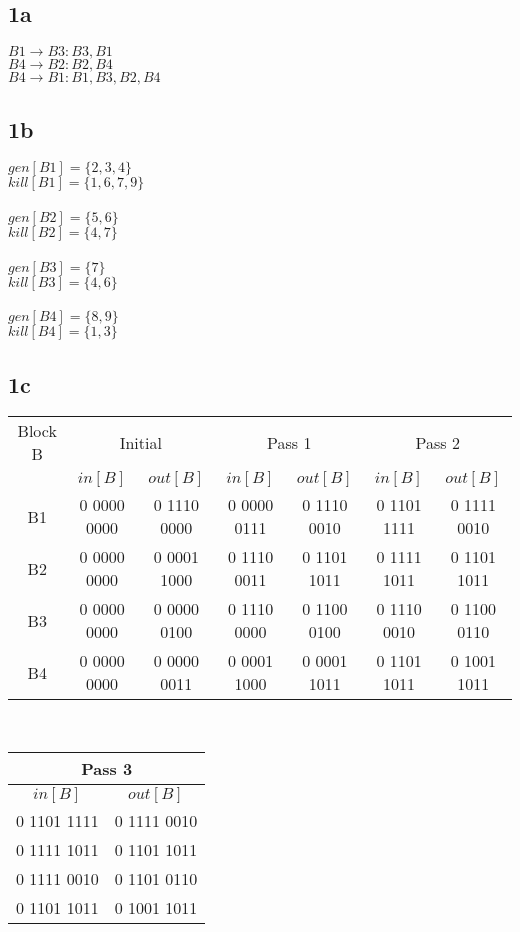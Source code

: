 \documentclass[10pt,a4paper]{article}
\author{Lucas Swartsenburg\\6174388}
\begin{document}
\subsection*{1a}
$B1 \rightarrow B3:{B3,B1}$ \\
$B4 \rightarrow B2:{B2,B4}$ \\
$B4 \rightarrow B1:{B1,B3,B2,B4}$

\subsection*{1b}
$gen[B1]= \{2,3,4\} $\\
$kill[B1]= \{1,6,7,9\} $\\
\\
$gen[B2]= \{5,6\} $\\
$kill[B2]= \{4,7\} $\\
\\
$gen[B3]= \{7\} $\\
$kill[B3]= \{4,6\} $\\
\\
$gen[B4]= \{8,9\} $\\
$kill[B4]= \{1,3\} $\\

\subsection*{1c}
\begin{tabular}{|c|c|c|c|c|c|c|}
\hline 
Block B   & \multicolumn{2}{|c|}{Initial}   & \multicolumn{2}{|c|}{Pass 1}     & \multicolumn{2}{|c|}{Pass 2}     \\  
\cline{2-7}
          & $in[B]$        & $out[B]$       & $in[B]$        & $out[B]$        & $in[B]$        & $out[B]$        \\ 
\hline                                                                                                      
B1        & 0 0000 0000    & 0 1110 0000    & 0 0000 0111    &  0 1110 0010    & 0 1101 1111    &  0 1111 0010    \\ 
B2        & 0 0000 0000    & 0 0001 1000    & 0 1110 0011    &  0 1101 1011    & 0 1111 1011    &  0 1101 1011    \\ 
B3        & 0 0000 0000    & 0 0000 0100    & 0 1110 0000    &  0 1100 0100    & 0 1110 0010    &  0 1100 0110    \\ 
B4        & 0 0000 0000    & 0 0000 0011    & 0 0001 1000    &  0 0001 1011    & 0 1101 1011    &  0 1001 1011    \\ 
\hline 
\end{tabular} 
\\
\begin{tabular}{|c|c|}
\hline 
\multicolumn{2}{|c|}{Pass 3}     \\  
\hline
$in[B]$        & $out[B]$        \\ 
\hline            
0 1101 1111    &  0 1111 0010    \\ 
0 1111 1011    &  0 1101 1011    \\ 
0 1111 0010    &  0 1101 0110    \\ 
0 1101 1011    &  0 1001 1011    \\ 
\hline 
\end{tabular} 
\end{document}
